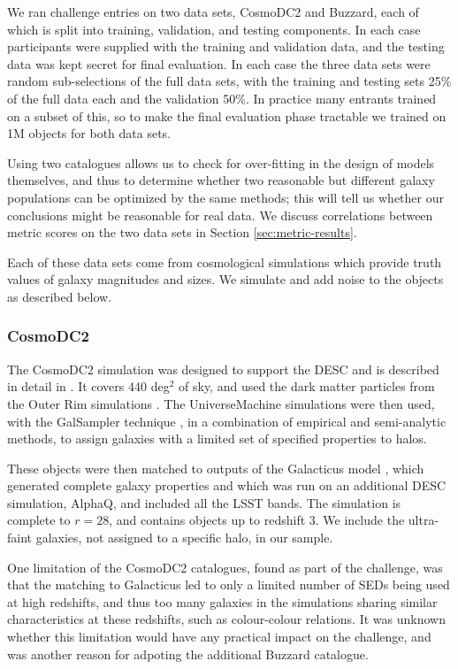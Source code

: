 \documentclass[twocolumn,twocolappendix]{aastex63}
\begin{document}
We ran challenge entries on two data sets, CosmoDC2 and Buzzard, each of which is split into training, 
validation, and testing components.  In each case participants were supplied with the training and 
validation data, and the testing data was kept secret for final evaluation. In each case the three
data sets were random sub-selections of the full data sets, with the training and testing sets 25\% of 
the full data each and the validation 50\%. In practice many entrants trained on a subset of
this, so to make the final evaluation phase tractable we trained on 1M objects for both data sets.

Using two catalogues allows us to check
for over-fitting in the design of models themselves, and thus to determine whether two
reasonable but different galaxy populations can be optimized by the same methods; this will
tell us whether our conclusions might be reasonable for real data. We discuss correlations
between metric scores on the two data sets in Section \ref{sec:metric-results}.

Each of these data sets come from cosmological simulations which provide truth values of galaxy magnitudes
and sizes.  We simulate and add noise to the objects as described below.

\subsubsection{CosmoDC2}

The CosmoDC2 simulation was designed to support the DESC and 
is described in detail in \citet{cosmodc2}.  It covers 440
deg${}^2$ of sky, and used the dark matter particles from the Outer Rim
simulations \citep{outer_rim}.  The UniverseMachine \citep{universe_machine}
simulations were then used, with the GalSampler technique \citep{galsampler},
in a combination of empirical and semi-analytic
methods, to assign galaxies with a limited set of specified properties to halos.

These objects were then matched to outputs of the Galacticus model
\citep{galacticus}, which generated complete galaxy properties and which was run
on an additional DESC simulation, AlphaQ, and included all the LSST bands.  The
simulation is complete to $r=28$, and contains objects up to redshift 3.  We
include the ultra-faint galaxies, not assigned to a specific halo, in our sample.

One limitation of the CosmoDC2 catalogues, found as part of the challenge,
was that the matching to Galacticus led to only a limited number of SEDs being
used at high redshifts, and thus too many galaxies in the simulations sharing
similar characteristics at these redshifts, such as colour-colour relations.
It was unknown whether this limitation would have any practical impact on the challenge,
and was another reason for adpoting the additional Buzzard catalogue.
\end{document}
